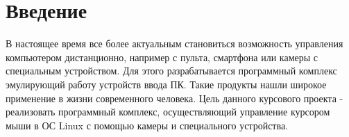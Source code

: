 \section*{Введение}
В настоящее время все более актуальным становиться возможность управления компьютером дистанционно, например с пульта, смартфона или камеры с специальным устройством. 
Для этого разрабатывается программный комплекс эмулирующий работу устройств ввода ПК.
Такие продукты нашли широкое применение в жизни современного человека.
Цель данного курсового проекта - реализовать программный комплекс, осуществляющий управление курсором мыши в ОС Linux с помощью камеры и специального устройства.